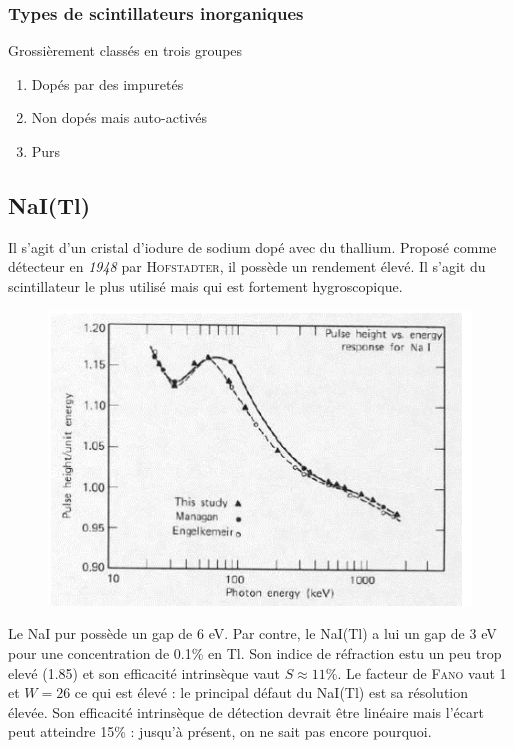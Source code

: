 \subsubsection{Types de scintillateurs inorganiques}
Grossièrement classés en trois groupes
\begin{enumerate}
\item Dopés par des impuretés
\item Non dopés mais auto-activés
\item Purs
\end{enumerate}


\subsection{NaI(Tl)}%
Il s'agit d'un cristal d'iodure de sodium dopé avec du thallium. Proposé comme détecteur en 
\textit{1948} par \textsc{Hofstadter}, il possède un rendement élevé. Il s'agit du scintillateur
le plus utilisé mais qui est fortement hygroscopique.\\

	\begin{figure}
	\vspace{-5mm}
	\includegraphics[scale=0.55]{ch10/image4}
	\end{figure}
Le NaI pur possède un gap de 6 eV. Par contre, le NaI(Tl) a lui un gap de 3 eV pour une concentration
de 0.1\% en Tl. Son indice de réfraction estu un peu trop elevé (1.85) et son efficacité 
intrinsèque vaut $S\approx11\%$. Le facteur de \textsc{Fano} vaut 1 et $W=26$ ce qui est élevé : 
le principal défaut du NaI(Tl) est sa résolution élevée. Son efficacité intrinsèque de détection
devrait être linéaire mais l'écart peut atteindre 15\% : jusqu'à présent, on ne sait pas encore
pourquoi.

